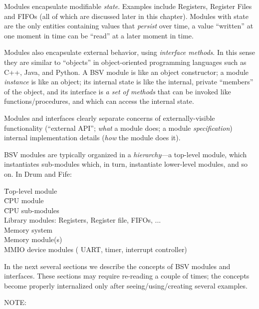 Modules encapsulate modifiable \emph{state}.  Examples include
Registers, Register Files and FIFOs (all of which are discussed later
in this chapter).  Modules with state are the only entities containing
values that \emph{persist} over time, {\ie} a value ``written'' at one
moment in time can be ``read'' at a later moment in time.


Modules also encapsulate external behavior, using \emph{interface
methods}.  In this sense they are similar to ``objects'' in
object-oriented programming languages such as C++, Java, and Python.
A BSV module is like an object constructor; a module \emph{instance}
is like an object; its internal state is like the internal, private
``members'' of the object, and its interface is \emph{a set of
methods} that can be invoked like functions/procedures, and which can
access the internal state.

Modules and interfaces clearly separate concerns of externally-visible
functionality (``external API''; \emph{what} a module does; a module
\emph{specification}) {\vs} internal implementation details
(\emph{how} the module does it).

BSV modules are typically organized in a \emph{hierarchy}---a top-level module, which instantiates sub-modules which, in turn, instantiate lower-level modules, and so on.
In Drum and Fife:
\begin{tabbing}
\hmm \= Top-level module \\
     \> \hmm \= CPU module \\
     \>      \> \hmm \= CPU sub-modules \\
     \>      \>      \> \hmm Library modules: Registers, Register file, FIFOs, ... \\
     \>      \> Memory system \\
     \>      \>      \> Memory module(s) \\
     \>      \>      \> MMIO device modules ({\eg} UART, timer, interrupt controller)
\end{tabbing}

In the next several sections we describe the concepts of BSV modules
and interfaces.  These sections may require re-reading a couple of
times; the concepts become properly internalized only after
seeing/using/creating several examples.

\vspace{2ex}

NOTE:

